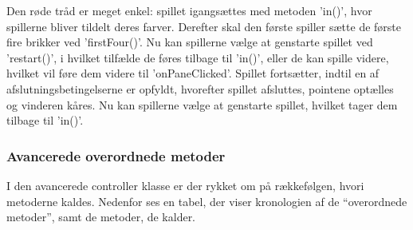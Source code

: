 Den røde tråd er meget enkel: spillet igangsættes med metoden 'in()', hvor spillerne bliver tildelt deres farver. Derefter skal den første spiller sætte de første fire brikker ved 'firstFour()'. Nu kan spillerne vælge at genstarte spillet ved 'restart()', i hvilket tilfælde de føres tilbage til 'in()', eller de kan spille videre, hvilket vil føre dem videre til 'onPaneClicked'. Spillet fortsætter, indtil en af afslutningsbetingelserne er opfyldt, hvorefter spillet afsluttes, pointene optælles og vinderen kåres. Nu kan spillerne vælge at genstarte spillet, hvilket tager dem tilbage til 'in()'.
\subsubsection{Avancerede overordnede metoder}\label{AOM}
I den avancerede controller klasse er der rykket om på rækkefølgen, hvori metoderne kaldes. Nedenfor ses en tabel, der viser kronologien af de ``overordnede metoder'', samt de metoder, de kalder.

